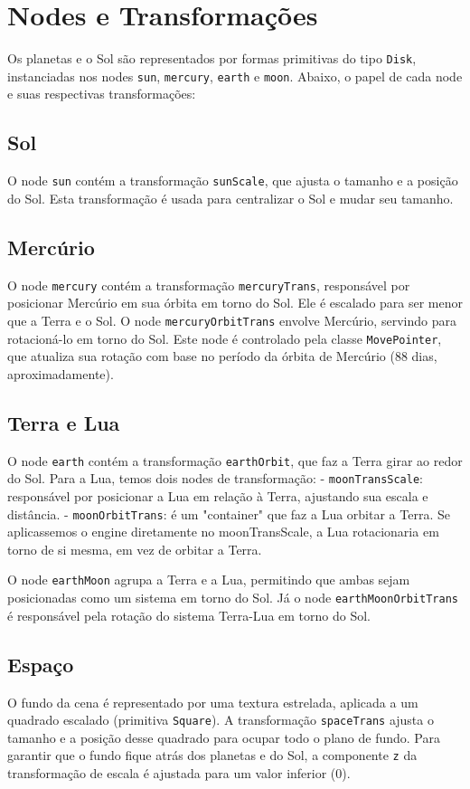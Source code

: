 \documentclass[11pt, a4paper]{article}
\begin{document}
\section {Nodes e Transformações}

Os planetas e o Sol são representados por formas primitivas do tipo 
\texttt{Disk}, instanciadas nos nodes \texttt{sun}, \texttt{mercury}, 
\texttt{earth} e \texttt{moon}. Abaixo, o papel de cada node e suas 
respectivas transformações:

\subsection{Sol}
O node \texttt{sun} contém a transformação \texttt{sunScale}, que ajusta o 
tamanho e a posição do Sol. Esta transformação é usada para centralizar o Sol e 
mudar seu tamanho.

\subsection{Mercúrio}
O node \texttt{mercury} contém a transformação \texttt{mercuryTrans}, responsável 
por posicionar Mercúrio em sua órbita em torno do Sol. Ele é escalado para ser 
menor que a Terra e o Sol. O node \texttt{mercuryOrbitTrans} envolve Mercúrio, 
servindo para rotacioná-lo em torno do Sol. Este node é controlado pela classe 
\texttt{MovePointer}, que atualiza sua rotação com base no período da órbita de 
Mercúrio (88 dias, aproximadamente).

\subsection{Terra e Lua}
O node \texttt{earth} contém a transformação \texttt{earthOrbit}, que faz a 
Terra girar ao redor do Sol. Para a Lua, temos dois nodes de transformação:
- \texttt{moonTransScale}: responsável por posicionar a Lua em relação à Terra, 
ajustando sua escala e distância.
- \texttt{moonOrbitTrans}: é um "container" que faz a Lua orbitar a Terra. Se
aplicassemos o engine diretamente no moonTransScale, a Lua rotacionaria em 
torno de si mesma, em vez de orbitar a Terra.

O node \texttt{earthMoon} agrupa a Terra e a Lua, permitindo que ambas sejam 
posicionadas como um sistema em torno do Sol. Já o node 
\texttt{earthMoonOrbitTrans} é responsável pela rotação do sistema Terra-Lua em 
torno do Sol.

\subsection{Espaço}
O fundo da cena é representado por uma textura estrelada, aplicada a um quadrado 
escalado (primitiva \texttt{Square}). A transformação \texttt{spaceTrans} ajusta 
o tamanho e a posição desse quadrado para ocupar todo o plano de fundo. Para 
garantir que o fundo fique atrás dos planetas e do Sol, a componente \texttt{z} 
da transformação de escala é ajustada para um valor inferior (0).
\end{document}
